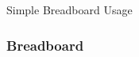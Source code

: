 \documentclass[serif,mathserif, 12pt]{beamer}
\begin{document}
\begin{frame}{Simple Breadboard Usage}
    \frametitle{Breadboard}
    \begin{figure}
        \centering
        
    \end{figure}
\end{frame}
\end{document}

